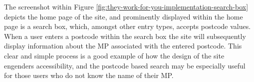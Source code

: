 The screenshot within Figure \ref{fig:they-work-for-you-implementation-search-box} depicts the home page of the site,
and prominently displayed within the home page is a search box, which, amongst other entry types, accepts postcode \cite{postcodes-uk} values.
When a user enters a postcode within the search box the site will subsequently display information about the MP associated with the entered postcode.
This clear and simple process is a good example of how the design of the site engenders accessibility,
and the postcode based search may be especially useful for those users who do not know the name of their MP.

